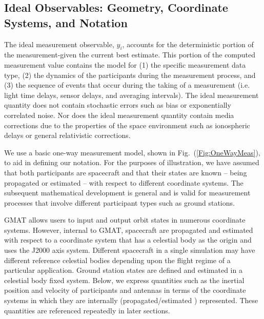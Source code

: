 \subsection{Ideal Observables: Geometry, Coordinate Systems, and Notation}

The ideal measurement observable, $y_i$, accounts for the deterministic portion of the measurement-given the current best estimate.  This portion of the computed measurement value contains the model for (1) the specific measurement data
type, (2) the dynamics of the participants during the measurement process, and (3) the sequence of events that occur
during the taking of a measurement (i.e. light time delays, sensor delays,  and averaging intervals).  The ideal measurement quantity does not contain stochastic errors such as bias or exponentially correlated noise.  Nor does the ideal measurement quantity contain media corrections due to the properties of the space environment such as ionospheric delays or general relativistic corrections.

We use a basic one-way measurement model, shown in Fig.~(\ref{Fig:OneWayMeas}), to aid in defining our notation.  For the purposes of illustration, we have assumed that both participants
are spacecraft and that their states are known -- being propagated or estimated -- with respect to different coordinate systems.  The subsequent mathematical development is general and is valid for measurement processes that involve
different participant types such as ground stations.

GMAT allows users to input and output orbit states in numerous coordinate systems.  However, internal to GMAT, spacecraft are propagated and estimated with respect to a coordinate system that has a celestial body as the origin and uses the J2000 axis system.  Different spacecraft in a single simulation may have different reference celestial bodies depending upon the flight regime of a particular application.  Ground station states are defined and estimated in a celestial body fixed system.  Below, we express quantities such as the inertial position and velocity of participants and antennas in terms of the coordinate systems in which they are internally (propagated/estimated ) represented.  These quantities are referenced repeatedly in later sections.



